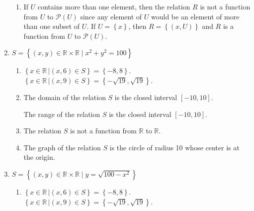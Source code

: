 \begin{enumerate}
\begin{enumerate}

\item If $U$ contains more than one element, then the relation $R$ is not a function from $U$ to $\mathcal{P} \left( U \right)$ since any element of $U$ would be an element of more than one subset of $U$.  If $U = \left\{ x \right\}$, then $R = \left\{ \left( x, U \right) \right\}$ and $R$ is a function from $U$ to $\mathcal{P} \left( U \right)$.
\end{enumerate}



\item $S = \left\{ {\left( {x, y} \right) \in \mathbb{R} \times \mathbb{R} \mid x^2  + y^2  = 100} \right\}$
\begin{enumerate}
\item $\left\{ {\left. {x \in \mathbb{R}\,} \right| \left( {x, 6} \right) \in S} \right\} = \left\{ { - 8, 8} \right\}$. \\ $\left\{ {\left. {x \in \mathbb{R}\,} \right| \left( {x, 9} \right) \in S} \right\} = \left\{ { - \sqrt {19} , \sqrt {19} } \right\}$.

\item The domain of the relation $S$ is the closed interval $\left[ -10, 10 \right]$.

The range of the relation $S$ is the closed interval $\left[ -10, 10 \right]$.


\item The relation $S$ is not a function from $\mathbb{R}$ to $\mathbb{R}$.

\item The graph of the relation $S$ is the circle of radius 10 whose center is at the origin.
\end{enumerate}



\item $S = \left\{ {\left( {x, y} \right) \in \mathbb{R} \times \mathbb{R}   \mid y = \sqrt {100 - x^2 } } \right\}$
\begin{enumerate}
\item $\left\{ {\left. {x \in \mathbb{R}\,} \right| \left( {x, 6} \right) \in S} \right\} = \left\{ { - 8, 8} \right\}$. \\ $\left\{ {\left. {x \in \mathbb{R}\,} \right| \left( {x, 9} \right) \in S} \right\} = \left\{ { - \sqrt {19} , \sqrt {19} } \right\}$.


\end{enumerate}
\end{enumerate}
